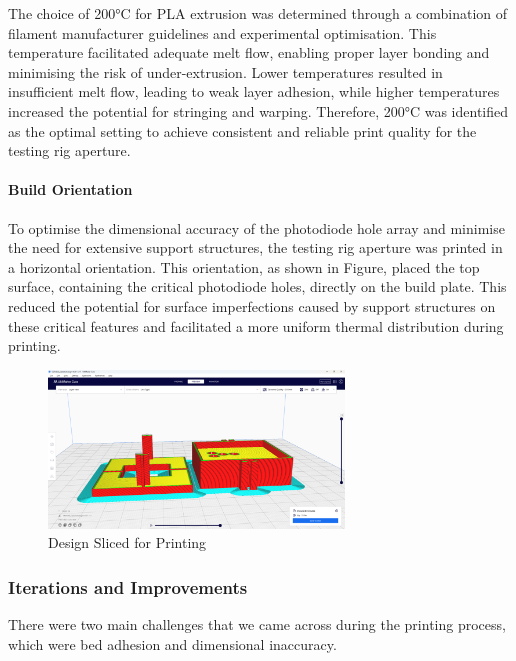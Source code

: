 The choice of 200°C for PLA extrusion was determined through a combination of filament manufacturer guidelines and experimental optimisation. 
This temperature facilitated adequate melt flow, enabling proper layer bonding and minimising the risk of under-extrusion. 
Lower temperatures resulted in insufficient melt flow, leading to weak layer adhesion, while higher temperatures increased the potential for stringing and warping. 
Therefore, 200°C was identified as the optimal setting to achieve consistent and reliable print quality for the testing rig aperture.

\paragraph{Build Orientation}

To optimise the dimensional accuracy of the photodiode hole array and minimise the need for extensive support structures, the testing rig aperture was printed in a horizontal orientation. 
This orientation, as shown in Figure, placed the top surface, containing the critical photodiode holes, directly on the build plate. 
This reduced the potential for surface imperfections caused by support structures on these critical features and facilitated a more uniform thermal distribution during printing.

\begin{figure}[htbp]
    \centering
    \includegraphics[width=0.7\textwidth]{figures/CAD-3DPrint/SLICED.png}
    \caption{Design Sliced for Printing}
    \label{fig:sliced}
   
    
\end{figure}

\subsubsection{Iterations and Improvements}
There were two main challenges that we came across during the printing process, which were bed adhesion and dimensional inaccuracy.

